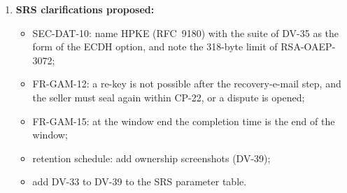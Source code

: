 \documentclass[11pt,a4paper]{article}
\begin{document}
\begin{enumerate}[label=\textbf{I-\arabic*}, leftmargin=*, nosep]
  \item \textbf{SRS clarifications proposed:}
  \begin{itemize}[nosep]
    \item SEC-DAT-10: name HPKE (RFC~9180) with the suite of DV-35 as the form of the ECDH option, and note the 318-byte limit of RSA-OAEP-3072;
    \item FR-GAM-12: a re-key is not possible after the recovery-e-mail step, and the seller must seal again within CP-22, or a dispute is opened;
    \item FR-GAM-15: at the window end the completion time is the end of the window;
    \item retention schedule: add ownership screenshots (DV-39);
    \item add DV-33 to DV-39 to the SRS parameter table.
  \end{itemize}
\end{enumerate}

\appendix
\end{document}
